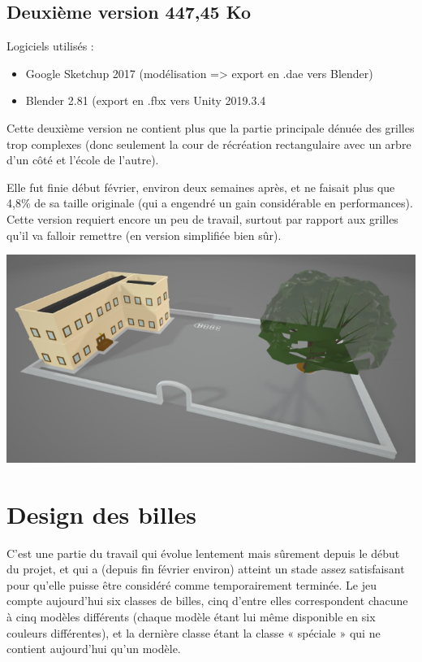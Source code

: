 \documentclass{article}
\begin{document}
\subsection{Deuxième version 447,45 Ko}
Logiciels utilisés :
\begin{itemize}
    \item Google Sketchup 2017 (modélisation => export en .dae vers Blender)
    \item Blender 2.81 (export en .fbx vers Unity 2019.3.4
\end{itemize}

Cette deuxième version ne contient plus que la partie principale dénuée des grilles trop complexes (donc seulement la cour de récréation rectangulaire avec un arbre d’un côté et l’école de l’autre).

Elle fut finie début février, environ deux semaines après, et ne faisait plus que 4,8\% de sa taille 	originale (qui a engendré un gain considérable en performances).
Cette version requiert encore un peu de travail, surtout par rapport aux grilles qu’il va falloir 	remettre (en version simplifiée bien sûr).

\begin{center}
\includegraphics[width=0.8\linewidth]{report/map2.png}\\
\end{center}

\section{Design des billes}
C’est une partie du travail qui évolue lentement mais sûrement depuis le début du projet, et qui a (depuis fin février environ) atteint un stade assez satisfaisant pour qu’elle puisse être considéré comme temporairement terminée. Le jeu compte aujourd’hui six classes de billes, cinq d’entre elles correspondent chacune à cinq modèles différents (chaque modèle étant lui même disponible en six couleurs différentes), et la dernière classe étant la classe « spéciale » qui ne contient aujourd’hui qu’un modèle.
\end{document}
